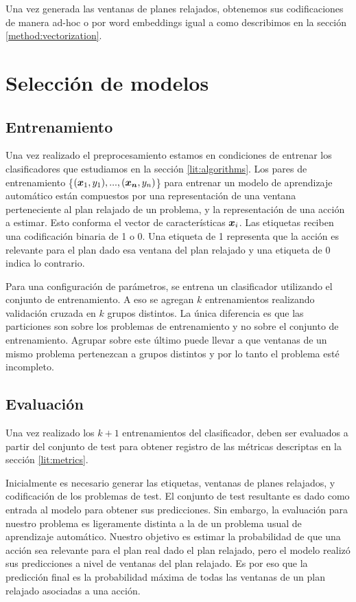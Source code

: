 Una vez generada las ventanas de planes relajados, obtenemos sus codificaciones
de manera ad-hoc o por word embeddings igual a como describimos en la sección
\ref{method:vectorization}.

\section{Selección de modelos}
\label{method:model_selection}

\subsection{Entrenamiento}

Una vez realizado el preprocesamiento estamos en condiciones de entrenar los
clasificadores que estudiamos en la sección \ref{lit:algorithms}. Los pares de
entrenamiento \{$(\boldsymbol{x}_1, y_1), ..., (\boldsymbol{x_n}, y_n)$\} para entrenar un
modelo de aprendizaje automático están compuestos por una representación de una
ventana perteneciente al plan relajado de un problema, y la representación de
una acción a estimar. Esto conforma el vector de características $\boldsymbol{x}_i$.
Las etiquetas reciben una codificación binaria de 1 o 0. Una etiqueta de 1
representa que la acción es relevante para el plan dado esa ventana del plan
relajado y una etiqueta de 0 indica lo contrario.

Para una configuración de parámetros, se entrena un clasificador utilizando
el conjunto de entrenamiento. A eso se agregan $k$ entrenamientos realizando
validación cruzada en $k$ grupos distintos. La única diferencia es que las
particiones son sobre los problemas de entrenamiento y no sobre el conjunto de
entrenamiento. Agrupar sobre este último puede llevar a que ventanas de un mismo
problema pertenezcan a grupos distintos y por lo tanto el problema esté
incompleto.

\subsection{Evaluación}

Una vez realizado los $k + 1$ entrenamientos del clasificador, deben ser
evaluados a partir del conjunto de test para obtener registro de las métricas
descriptas en la sección \ref{lit:metrics}. 

Inicialmente es necesario generar las etiquetas, ventanas de planes relajados, y
codificación de los problemas de test. El conjunto de test resultante es dado
como entrada al modelo para obtener sus predicciones. Sin embargo, la evaluación
para nuestro problema es ligeramente distinta a la de un problema usual de
aprendizaje automático. Nuestro objetivo es estimar la probabilidad de que una
acción sea relevante para el plan real dado el plan relajado, pero el modelo
realizó sus predicciones a nivel de ventanas del plan relajado. Es por eso que
la predicción final es la probabilidad máxima de todas las ventanas de un plan
relajado asociadas a una acción.

